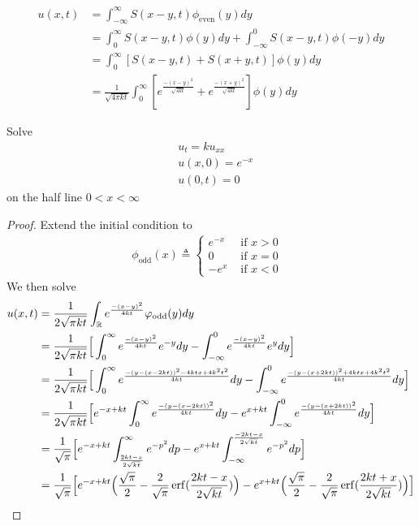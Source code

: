 \documentclass{report}
\begin{document}
\begin{mdframed}
\begin{align*}
u(x,t)&=\int_{-\infty}^{\infty} S(x-y,t)\phi_{\operatorname{even}}(y)dy \\
&=\int_{0}^{\infty}S(x-y,t)\phi (y)dy + \int^{0}_{-\infty} S(x-y,t)\phi (-y)dy \\
&= \int_0^{\infty} [S(x-y,t)+S(x+y,t)]\phi (y)dy \\
&=\frac{1}{\sqrt{4 \pi kt} }\int_0^{\infty} [e^{\frac{-(x-y)^2}{\sqrt{ 4k t} }}+ e^{\frac{-(x+y)^2}{\sqrt{ 4 kt} }}] \phi (y)dy
\end{align*}
\end{mdframed}
\begin{question}{}{}
Solve 
\begin{align*}
&u_t=ku_{xx}\\
&u(x,0)=e^{-x}\\
&u(0,t)=0
\end{align*}
on the half line $0<x<\infty$
\end{question}
\begin{proof}
Extend the initial condition to 
\begin{align*}
\phi_{\operatorname{odd}}(x)\triangleq \begin{cases}
  e^{-x}& \text{ if $x>0$ }\\
  0& \text{ if $x=0$ }\\
  -e^{x}& \text{ if $x<0$ }
\end{cases}
\end{align*}
We then solve 
\begin{align*}
u(x,t)&=\frac{1}{2\sqrt{\pi kt} }\int_{\mathbb{R}} e^{\frac{-(x-y)^2}{4kt}}\varphi_{\operatorname{odd}}(y)dy\\
&=\frac{1}{2 \sqrt{\pi kt} }\Big[\int_0^\infty e^{\frac{-(x-y)^2}{4kt}}e^{-y}dy - \int_{-\infty}^0 e^{\frac{-(x-y)^2}{4kt}}e^ydy  \Big] \\
&=\frac{1}{2 \sqrt{\pi kt} }\Big[\int_0^{\infty}e^{\frac{-(y-(x-2kt))^2-4ktx+4k^2t^2}{4kt}}dy -\int^{0}_{-\infty}e^{\frac{-(y-(x+2kt))^2+4ktx+4k^2t^2}{4kt}}dy  \Big] \\
&=\frac{1}{2 \sqrt{\pi kt} }\Big[e^{-x+kt}\int_0^{\infty}e^{\frac{-(y-(x-2kt))^2}{4kt}}dy -e^{x+kt}\int^{0}_{-\infty}e^{\frac{-(y-(x+2kt))^2}{4kt}}dy  \Big]  \\
&=\frac{1}{\sqrt{\pi} }\Big[e^{-x+kt}\int_{\frac{2kt-x}{2\sqrt{kt} }}^{\infty}e^{-p^2}dp -e^{x+kt}\int_{-\infty}^{\frac{-2kt-x}{2\sqrt{kt} }}e^{-p^2}dp \Big]\\
&=\frac{1}{\sqrt{\pi} }\Big[e^{-x+kt}\Big( \frac{\sqrt{\pi} }{2}- \frac{2}{\sqrt{\pi}}\operatorname{erf}(\frac{2kt-x}{2\sqrt{kt} })   \Big)-e^{x+kt}\Big( \frac{\sqrt{\pi} }{2}- \frac{2}{\sqrt{\pi} }\operatorname{erf}( \frac{2kt+x}{2\sqrt{kt}}) \Big) \Big]
\end{align*}
\end{proof}
\end{document}
